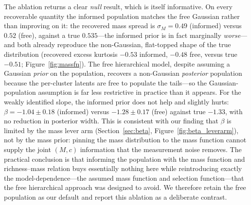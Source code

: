 The ablation returns a clear \emph{null} result, which is itself informative. On every recoverable
quantity the informed population matches the free Gaussian rather than improving on it: the recovered
mass spread is $\sigma_M=0.49$ (informed) versus $0.52$ (free), against a true $0.535$---the informed
prior is in fact marginally \emph{worse}---and both already reproduce the non-Gaussian, flat-topped
shape of the true distribution (recovered excess kurtosis $-0.53$ informed, $-0.48$ free, versus true
$-0.51$; Figure~\ref{fig:massfn}). The free hierarchical model, despite assuming a Gaussian
\emph{prior} on the population, recovers a non-Gaussian \emph{posterior} population because the
per-cluster latents are free to populate the tails---so the Gaussian-population assumption is far less
restrictive in practice than it appears. For the weakly identified slope, the informed prior does not
help and slightly hurts: $\beta=-1.04\pm0.18$ (informed) versus $-1.28\pm0.17$ (free) against true
$-1.33$, with no reduction in posterior width. This is consistent with our finding that $\beta$ is
limited by the mass lever arm (Section~\ref{sec:beta}, Figure~\ref{fig:beta_leverarm}), not by the
mass prior: pinning the mass distribution to the mass function cannot supply the joint $(M,c)$
information that the measurement noise removes. The practical conclusion is that informing the
population with the mass function and richness--mass relation buys essentially nothing here while
reintroducing exactly the model-dependence---the assumed mass function and selection function---that
the free hierarchical approach was designed to avoid. We therefore retain the free population as our
default and report this ablation as a deliberate contrast.
